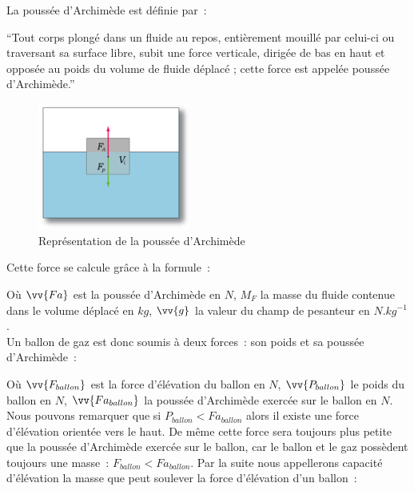 \documentclass[a4paper,11pt]{article}
\begin{document}
La poussée d'Archimède est définie par~:

\enquote{Tout corps plongé dans un fluide au repos, entièrement mouillé par celui-ci ou traversant sa surface libre, subit une force verticale, dirigée de bas en haut et opposée au poids du volume de fluide déplacé ; cette force est appelée poussée d'Archimède.}

\begin{figure}[H]
	\centering
	\includegraphics[width=5cm]{../Images/pousse_archimede.png}
	\caption{Représentation de la poussée d'Archimède}
\end{figure}

Cette force se calcule grâce à la formule~:

\begin{center}
\end{center}

Où $\vv{Fa}$ est la poussée d'Archimède en $N$, $M_F$ la masse du fluide contenue dans le volume déplacé en $kg$, $\vv{g}$ la valeur du champ de pesanteur en $N.kg^{-1}$. \\

Un ballon de gaz est donc soumis à deux forces~: son poids et sa poussée d'Archimède~:

\begin{center}
\end{center}

Où $\vv{F_{ballon}}$ est la force d'élévation du ballon en $N$, $\vv{P_{ballon}}$ le poids du ballon en $N$, $\vv{Fa_{ballon}}$ la poussée d'Archimède exercée sur le ballon en $N$. \\

Nous pouvons remarquer que si $P_{ballon} < Fa_{ballon}$ alors il existe une force d'élévation orientée vers le haut. De même cette force sera toujours plus petite que la poussée d'Archimède exercée sur le ballon, car le ballon et le gaz possèdent toujours une masse~: $F_{ballon} < Fa_{ballon}$.
Par la suite nous appellerons capacité d'élévation la masse que peut soulever la force d'élévation d'un ballon~:
\begin{center}
\end{center}
\end{document}
